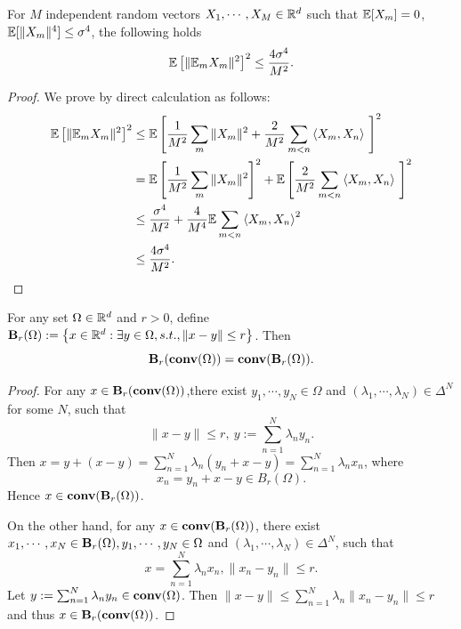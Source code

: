 \documentclass{article} %
\numberwithin{equation}{section}
\begin{document}
\begin{lemma}\label{lem:4th_noise}
    For $M$ independent random vectors $X_1,\cdots,X_M \in \mathbb{R}^d$ such that $\mathbb{E} [X_m]=0$, $\mathbb{E} [\|X_m\|^4] \leq \sigma^4$, the following holds
    \begin{equation}
        \mathbb{E} \left[\|\mathbb{E}_mX_m\|^2\right]^2 \leq \frac{4\sigma^4}{M^2}.
    \end{equation}
\end{lemma}

\begin{proof}
    We prove by direct calculation as follows:
    \begin{equation}
        \begin{aligned}
            \mathbb{E} \left[\|\mathbb{E}_mX_m\|^2\right]^2 
            &\leq \mathbb{E} \left[\frac{1}{M^2}\sum_m\|X_m\|^2 + \frac{2}{M^2}\sum_{m<n}\left\langle X_m, X_n\right\rangle\ \right]^2 \\
            &= \mathbb{E} \left[\frac{1}{M^2}\sum_m\|X_m\|^2\right]^2 + \mathbb{E}\left[ \frac{2}{M^2}\sum_{m<n}\left\langle X_m, X_n\right\rangle\ \right]^2 \\
            &\leq \frac{\sigma^4}{M^2}+\frac{4}{M^4}\mathbb{E}\sum_{m<n}\left\langle X_m, X_n\right\rangle^2 \\
            &\leq \frac{4\sigma^4}{M^2}.
        \end{aligned}
    \end{equation}
\end{proof}

\begin{lemma}\label{lem:conv_ball}
    For any set $\Omega\in \mathbb{R}^d$ and $r>0$, define $\mbox{\bf B}_r(\Omega):=\left\{ x\in \mathbb{R}^d: \exists y\in \Omega, s.t., \|x-y\|\leq r\right\}$. Then 
    \begin{equation}
        \mbox{\bf B}_r(\mbox{\bf conv}(\Omega))=\mbox{\bf conv}(\mbox{\bf B}_r(\Omega)).
    \end{equation}
\end{lemma}

\begin{proof}
    For any $x\in \mbox{\bf B}_r(\mbox{\bf conv}(\Omega))$,there exist $y_1,\cdots,y_N\in \Omega$ and $(\lambda_1,\cdots,\lambda_N)\in \Delta^N$ for some $N$, such that
    \begin{equation}
        \|x-y\|\leq r,\ y:=\sum_{n=1}^N\lambda_ny_n.
    \end{equation}
    Then $x=y+(x-y)=\sum_{n=1}^N\lambda_n(y_n+x-y)=\sum_{n=1}^N\lambda_nx_n$, where 
    \begin{equation}
        x_n = y_n+x-y \in B_r(\Omega).
    \end{equation}
    Hence $x\in \mbox{\bf conv}(\mbox{\bf B}_r(\Omega))$.

    On the other hand, for any $x\in \mbox{\bf conv}(\mbox{\bf B}_r(\Omega))$, there exist $x_1,\cdots,x_N\in \mbox{\bf B}_r(\Omega), y_1,\cdots,y_N\in \Omega$ and $(\lambda_1,\cdots,\lambda_N)\in \Delta^N$, such that
    \begin{equation}
        x = \sum_{n=1}^N\lambda_nx_n, \|x_n-y_n\|\leq r.
    \end{equation}
    Let $y:=\sum_{n=1}^N\lambda_ny_n\in \mbox{\bf conv}(\Omega)$. Then $\|x-y\|\leq \sum_{n=1}^N\lambda_n\|x_n-y_n\|\leq r$ and thus $x\in \mbox{\bf B}_r(\mbox{\bf conv}(\Omega))$.
\end{proof}
\end{document}
